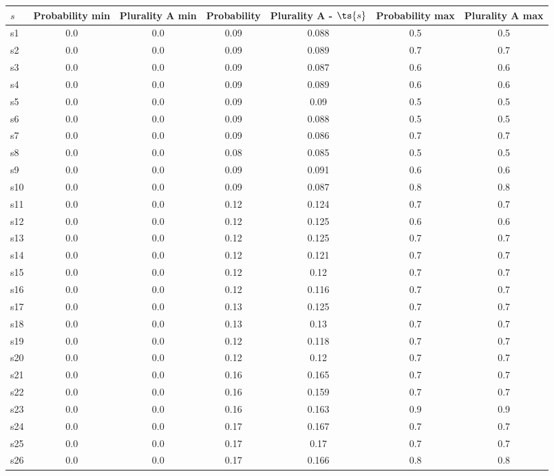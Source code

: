 \documentclass{article}
\begin{document}
\noindent\begin{tabular}{|l|c|c|c|c|c|c|}
\hline
$s$& Probability min & Plurality A min & Probability & Plurality A - $\ts{s}$ & Probability max & Plurality A max\\
\hline
s1 &0.0 & 0.0 & 0.09 & 0.088 & 0.5 & 0.5\\
\hline
s2 &0.0 & 0.0 & 0.09 & 0.089 & 0.7 & 0.7\\
\hline
s3 &0.0 & 0.0 & 0.09 & 0.087 & 0.6 & 0.6\\
\hline
s4 &0.0 & 0.0 & 0.09 & 0.089 & 0.6 & 0.6\\
\hline
s5 &0.0 & 0.0 & 0.09 & 0.09 & 0.5 & 0.5\\
\hline
s6 &0.0 & 0.0 & 0.09 & 0.088 & 0.5 & 0.5\\
\hline
s7 &0.0 & 0.0 & 0.09 & 0.086 & 0.7 & 0.7\\
\hline
s8 &0.0 & 0.0 & 0.08 & 0.085 & 0.5 & 0.5\\
\hline
s9 &0.0 & 0.0 & 0.09 & 0.091 & 0.6 & 0.6\\
\hline
s10 &0.0 & 0.0 & 0.09 & 0.087 & 0.8 & 0.8\\
\hline
s11 &0.0 & 0.0 & 0.12 & 0.124 & 0.7 & 0.7\\
\hline
s12 &0.0 & 0.0 & 0.12 & 0.125 & 0.6 & 0.6\\
\hline
s13 &0.0 & 0.0 & 0.12 & 0.125 & 0.7 & 0.7\\
\hline
s14 &0.0 & 0.0 & 0.12 & 0.121 & 0.7 & 0.7\\
\hline
s15 &0.0 & 0.0 & 0.12 & 0.12 & 0.7 & 0.7\\
\hline
s16 &0.0 & 0.0 & 0.12 & 0.116 & 0.7 & 0.7\\
\hline
s17 &0.0 & 0.0 & 0.13 & 0.125 & 0.7 & 0.7\\
\hline
s18 &0.0 & 0.0 & 0.13 & 0.13 & 0.7 & 0.7\\
\hline
s19 &0.0 & 0.0 & 0.12 & 0.118 & 0.7 & 0.7\\
\hline
s20 &0.0 & 0.0 & 0.12 & 0.12 & 0.7 & 0.7\\
\hline
s21 &0.0 & 0.0 & 0.16 & 0.165 & 0.7 & 0.7\\
\hline
s22 &0.0 & 0.0 & 0.16 & 0.159 & 0.7 & 0.7\\
\hline
s23 &0.0 & 0.0 & 0.16 & 0.163 & 0.9 & 0.9\\
\hline
s24 &0.0 & 0.0 & 0.17 & 0.167 & 0.7 & 0.7\\
\hline
s25 &0.0 & 0.0 & 0.17 & 0.17 & 0.7 & 0.7\\
\hline
s26 &0.0 & 0.0 & 0.17 & 0.166 & 0.8 & 0.8\\
\hline

\end{tabular}
\end{document}
